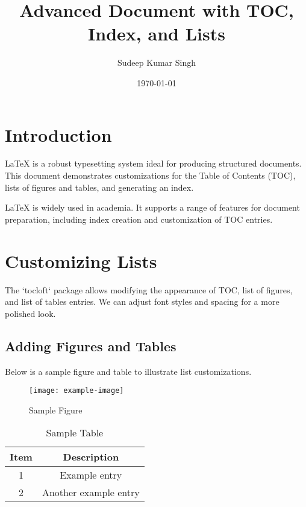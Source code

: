 \documentclass[12pt]{report}
\title{Advanced Document with TOC, Index, and Lists}
\author{Sudeep Kumar Singh}
\date{\today}
\begin{document}
\maketitle

\tableofcontents %
\listoffigures   %
\listoftables    %

\chapter{Introduction}
LaTeX is a robust typesetting system ideal for producing structured documents. This document demonstrates customizations for the Table of Contents (TOC), lists of figures and tables, and generating an index.

LaTeX is widely used in academia. It supports a range of features for document preparation, including index creation and customization of TOC entries.

\chapter{Customizing Lists}
The `tocloft` package allows modifying the appearance of TOC, list of figures, and list of tables entries. We can adjust font styles and spacing for a more polished look.

\section{Adding Figures and Tables}
Below is a sample figure and table to illustrate list customizations.

\begin{figure}[h!]
    \centering
    \texttt{[image: example-image]}
    \caption{Sample Figure}
\end{figure}

\begin{table}[h!]
    \centering
    \caption{Sample Table}
    \begin{tabular}{|c|c|}
        \hline
        \textbf{Item} & \textbf{Description} \\
        \hline
        1 & Example entry \\
        2 & Another example entry \\
        \hline
    \end{tabular}
\end{table}
\end{document}
